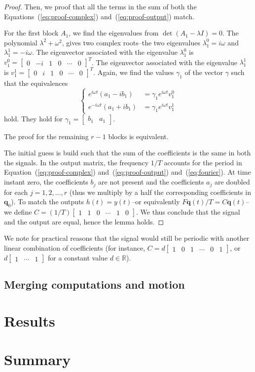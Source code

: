 \begin{proof}
Then, we proof that all the terms in the sum of both the Equations~(\ref{eq:proof-complex}) and~(\ref{eq:proof-output}) match. 

For the first block $A_1$, we find the eigenvalues from $\det(A_1-\lambda I)=0$. The polynomial $\lambda^2+\omega^2$, gives two complex roots--the two eigenvalues $\lambda_1^0=i\omega$ and $\lambda_1^1=-i\omega$. The eigenvector associated with the eigenvalue $\lambda_1^0$ is $v_1^0=\begin{bmatrix}0 & -i&1&0&\cdots&0\end{bmatrix}^T$. The eigenvector associated with the eigenvalue $\lambda_1^1$ is $v_1^1=\begin{bmatrix}0&i&1&0&\cdots&0\end{bmatrix}^T$. Again, we find the values $\gamma_1$ of the vector $\gamma$ such that the equivalences 
\begin{equation*}\begin{cases}
  e^{i\omega t}(a_1-ib_1)&=\gamma_1 e^{i\omega t}v_1^0\\
  e^{-i\omega t}(a_1+ib_1)&=\gamma_1 e^{i\omega t}v_1^1
\end{cases}\end{equation*}
hold. They hold for $\gamma_1=\begin{bmatrix}b_1&a_1\end{bmatrix}$. 

The proof for the remaining $r-1$ blocks is equivalent.

The initial guess is build such that the sum of the coefficients is the same in both the signals. In the output matrix, the frequency $1/T$ accounts for the period in Equation~(\ref{eq:proof-complex}) and~(\ref{eq:proof-output}) and~(\ref{eq:fourier}). At time instant zero, the coefficients $b_j$ are not present and the coefficients $a_j$ are doubled for each $j=1,2,\dots,r$ (thus we multiply by a half the corresponding coefficients in $\mathbf{q}_0$). To match the outputs $h(t)=y(t)$--or equivalently $F\mathbf{q}(t)/T=C\mathbf{q}(t)$--we define $C=(1/T)\begin{bmatrix}1 & 1 & 0 & \cdots & 1 & 0\end{bmatrix}$. We thus conclude that the signal and the output are equal, hence the lemma holds.

\end{proof}

We note for practical reasons that the signal would still be periodic with another linear combination of coefficients (for instance, $C=d\begin{bmatrix}1 & 0 & 1 & \cdots & 0 & 1\end{bmatrix}$, or $d\begin{bmatrix}1 & \cdots & 1\end{bmatrix}$ for a constant value $d\in\mathbb{R}$).

\subsection{Merging computations and motion}
\label{cp:model:}

\section{Results}


\section{Summary}

